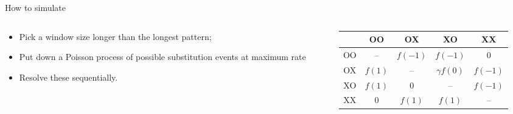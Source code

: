 \documentclass[smaller]{beamer}
\begin{document}
\begin{frame}{How to simulate}
  \begin{columns}[c]
    \begin{column}{.5\textwidth}

  \begin{itemize}

    \item Pick a window size longer than the longest pattern; 

    \item Put down a Poisson process of {\newthing possible} substitution events at maximum rate

    \item Resolve these sequentially.

  \end{itemize}
    \end{column}
    \begin{column}{.5\textwidth}

      \begin{tabular}{c|cccc}
        & OO & OX & XO & XX \\
        \hline
        OO & -- & $f(-1)$ & $f(-1)$ & 0 \\
        OX & $f(1)$ & -- & $\gamma f(0)$ & $f(-1)$ \\
        XO & $f(1)$ & 0 & -- & $f(-1)$ \\
        XX & 0 & $f(1)$ & $f(1)$ & --
      \end{tabular}

    \end{column}
  \end{columns}


\end{frame}
\end{document}
